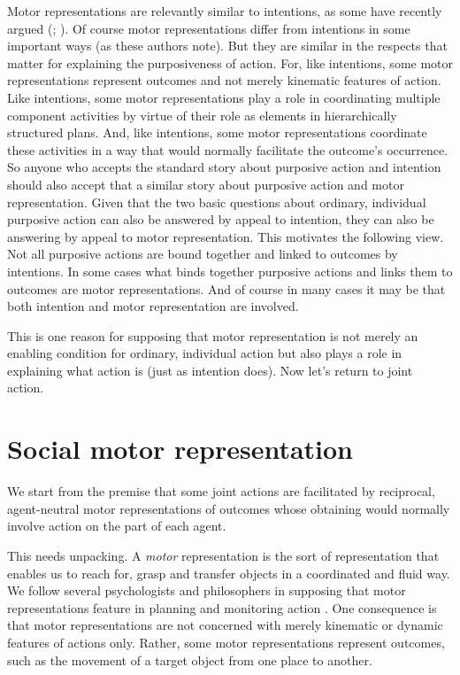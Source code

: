 \documentclass[12pt,\papersize]{extarticle}
\begin{document}
Motor representations are relevantly similar to intentions,
as some have recently argued (\citealp[pp.\ 189-90]{pacherie:2008_action}; \citealp{butterfill:2012_intention}).
Of course motor representations differ from intentions in some important ways (as these authors note).
But they are similar in the respects that matter for explaining the purposiveness of action.
For, like intentions, some motor representations represent outcomes and not merely kinematic features of action.
Like intentions, some motor representations play a role in coordinating multiple  component activities by virtue of their role as elements in hierarchically structured plans.
And, like intentions, some motor representations coordinate these activities in a way that would normally facilitate the outcome’s occurrence.
So anyone who accepts the standard story about purposive action and intention
should also accept that a similar story about purposive action and motor representation.
Given that the two basic questions about ordinary, individual purposive action can also be answered by appeal to intention,
they can also be answering by appeal to motor representation.
This motivates the following view.
Not all purposive actions are bound together and linked to outcomes by intentions. 
In some cases what binds together purposive actions and links them to outcomes are motor representations.
And of course in many cases it may be that both intention and motor representation are involved.

This is one reason for supposing that motor representation is not merely an enabling condition for ordinary, individual action but also plays a role in explaining what action is (just as intention does).
Now let’s return to joint action.



\section{Social motor representation}
We start from the premise that some joint actions are facilitated by reciprocal, agent-neutral motor representations of outcomes whose obtaining would normally involve action on the part of each agent.

This needs unpacking. 
A \textit{motor} representation is the sort of representation that enables us to reach for, grasp and transfer objects in a coordinated and fluid way.
We follow several psychologists and philosophers in supposing that motor representations feature in planning and monitoring action \citep[e.g.]{wolpert:1995internal, miall:1996_forward}.
One consequence is that motor representations are not concerned with merely kinematic or dynamic features of actions only.
Rather, some motor representations represent outcomes, such as the movement of a target object from one place to another.
\end{document}
